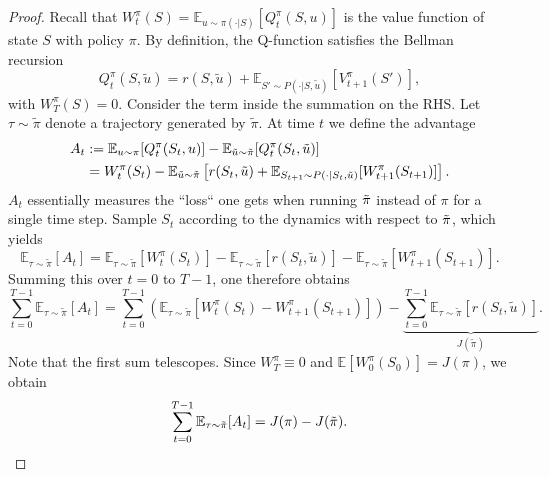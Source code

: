 \documentclass{article}
\begin{document}
\begin{proof}
    Recall that $W_t^\pi(S) = \mathbb{E}_{u \sim \pi(\cdot|S)}[Q_t^\pi(S, u)]$ is the value function of state $S$ with policy $\pi$. 
    By definition, the Q-function satisfies the Bellman recursion
    \[
    Q_t^\pi(S, \tilde{u}) = r(S, \tilde{u}) + \mathbb{E}_{S' \sim P(\cdot|S, \tilde{u})}[V_{t+1}^\pi(S')],
    \]
    with $W_T^\pi(S) = 0$.
    Consider the term inside the summation on the RHS. Let $\tau \sim \tilde{\pi}$ denote a trajectory generated by $\tilde{\pi}$. At time $t$ we define the advantage
    \begin{align*}
        A_t &:= \mathbb{E}_{u \sim \pi}[Q_t^\pi(S_t, u)] - \mathbb{E}_{\tilde{u} \sim \tilde{\pi}}[Q_t^\pi(S_t, \tilde{u})] \\
            &= W_t^\pi(S_t) - \mathbb{E}_{\tilde{u} \sim \tilde{\pi}}\left[ r(S_t, \tilde{u}) + \mathbb{E}_{S_{t+1} \sim P(\cdot \mid S_t, \Tilde u)}[W_{t+1}^\pi(S_{t+1})] \right].
    \end{align*}
    $A_t$ essentially measures the ``loss`` one gets when running $\Tilde{\pi}$ instead of $\pi$ for a single time step.
    Sample $S_t$ according to the dynamics with respect to $\Tilde{\pi}$, which yields
    \[
    \mathbb{E}_{\tau \sim \tilde{\pi}}[A_t] = \mathbb{E}_{\tau \sim \tilde{\pi}}[W_t^\pi(S_t)] - \mathbb{E}_{\tau \sim \tilde{\pi}}[r(S_t, \tilde{u})] - \mathbb{E}_{\tau \sim \tilde{\pi}}[W_{t+1}^\pi(S_{t+1})].
    \]
    Summing this over $t=0$ to $T-1$, one therefore obtains
    \[
    \sum_{t=0}^{T-1} \mathbb{E}_{\tau \sim \tilde{\pi}}[A_t] = \sum_{t=0}^{T-1} \left( \mathbb{E}_{\tau \sim \tilde{\pi}}[W_t^\pi(S_t) - W_{t+1}^\pi(S_{t+1})] \right) - \underbrace{\sum_{t=0}^{T-1} \mathbb{E}_{\tau \sim \tilde{\pi}}[r(S_t, \tilde{u})]}_{J(\tilde{\pi})}.
    \]
    Note that the first sum telescopes.
    Since $W_T^\pi \equiv 0$ and $\mathbb{E}[W_0^\pi(S_0)] = J(\pi)$, we obtain
    \[
    \sum_{t=0}^{T-1} \mathbb{E}_{\tau \sim \tilde{\pi}}[A_t] = J(\pi) - J(\tilde{\pi}). \qedhere
    \]
\end{proof}
\end{document}
